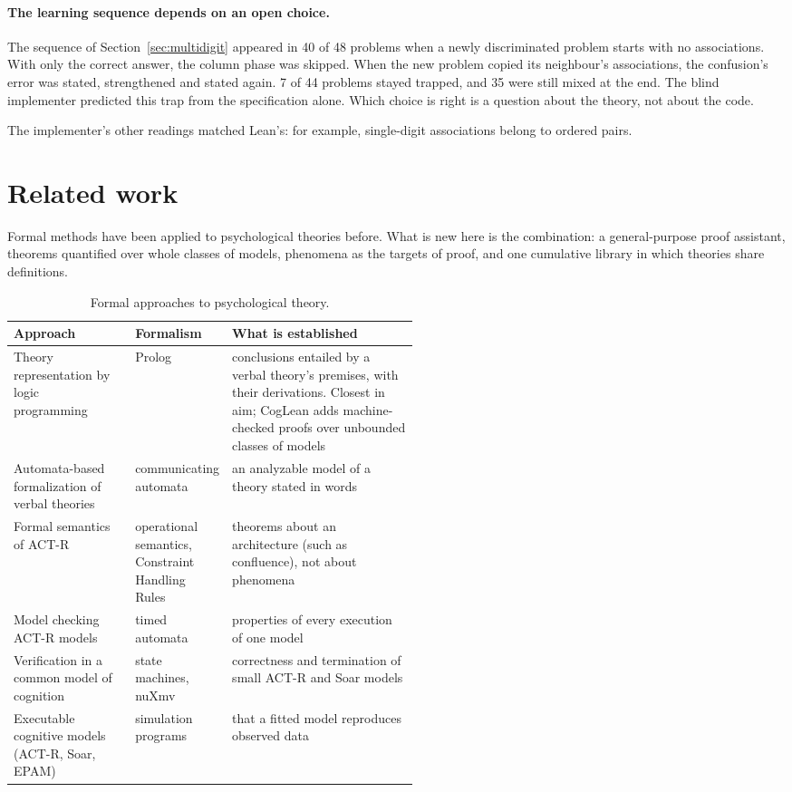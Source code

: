 \documentclass[11pt]{article}
\begin{document}
\paragraph{The learning sequence depends on an open choice.} The sequence of Section~\ref{sec:multidigit} appeared in 40 of 48 problems when a newly discriminated problem starts with no associations. With only the correct answer, the column phase was skipped. When the new problem copied its neighbour's associations, the confusion's error was stated, strengthened and stated again. 7 of 44 problems stayed trapped, and 35 were still mixed at the end. The blind implementer predicted this trap from the specification alone. Which choice is right is a question about the theory, not about the code.

The implementer's other readings matched Lean's: for example, single-digit associations belong to ordered pairs.

\section{Related work}

Formal methods have been applied to psychological theories before. What is new here is the combination: a general-purpose proof assistant, theorems quantified over whole classes of models, phenomena as the targets of proof, and one cumulative library in which theories share definitions.

\begin{table}[h]
\centering
\small
\begin{tabularx}{\linewidth}{@{}p{0.3\linewidth}p{0.22\linewidth}X@{}}
\toprule
Approach & Formalism & What is established \\
\midrule
Theory representation by logic programming~\cite{rohner2021} & Prolog & conclusions entailed by a verbal theory's premises, with their derivations. Closest in aim; CogLean adds machine-checked proofs over unbounded classes of models \\
Automata-based formalization of verbal theories~\cite{finkel2025} & communicating automata & an analyzable model of a theory stated in words \\
Formal semantics of ACT-R~\cite{gall2017semantics,gall2017confluence} & operational semantics, Constraint Handling Rules & theorems about an architecture (such as confluence), not about phenomena \\
Model checking ACT-R models~\cite{langenfeld2019} & timed automata & properties of every execution of one model \\
Verification in a common model of cognition~\cite{laird2017,ganeriwala2025} & state machines, nuXmv & correctness and termination of small ACT-R and Soar models \\
Executable cognitive models (ACT-R, Soar, EPAM) & simulation programs & that a fitted model reproduces observed data \\
\bottomrule
\end{tabularx}
\caption{Formal approaches to psychological theory.}
\end{table}
\end{document}
